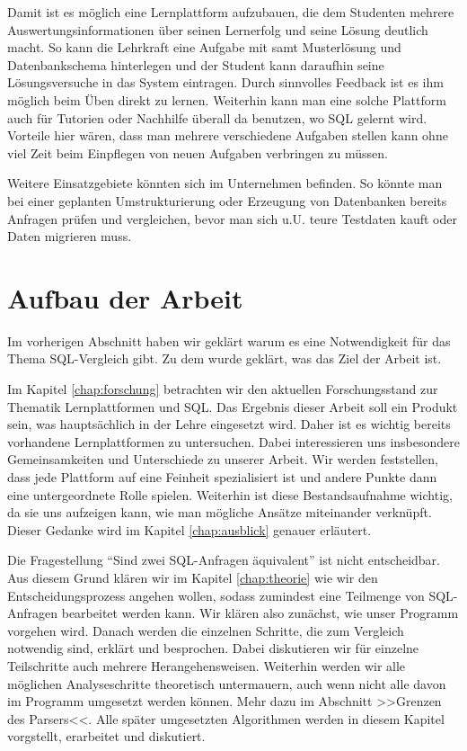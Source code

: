 Damit ist es möglich eine Lernplattform aufzubauen, die dem Studenten mehrere Auswertungsinformationen über seinen Lernerfolg und seine Lösung deutlich macht. So kann die Lehrkraft eine Aufgabe mit samt Musterlösung und Datenbankschema hinterlegen und der Student kann daraufhin seine Lösungsversuche in das System eintragen. Durch sinnvolles Feedback ist es ihm möglich beim Üben direkt zu lernen. Weiterhin kann man eine solche Plattform auch für Tutorien oder Nachhilfe überall da benutzen, wo SQL gelernt wird. Vorteile hier wären, dass man mehrere verschiedene Aufgaben stellen kann ohne viel Zeit beim Einpflegen von neuen Aufgaben verbringen zu müssen.

Weitere Einsatzgebiete könnten sich im Unternehmen befinden. So könnte man bei einer geplanten Umstrukturierung oder Erzeugung von Datenbanken bereits Anfragen prüfen und vergleichen, bevor man sich u.U. teure Testdaten kauft oder Daten migrieren muss.

\section{Aufbau der Arbeit}

Im vorherigen Abschnitt haben wir geklärt warum es eine Notwendigkeit für das Thema SQL-Vergleich gibt. Zu dem wurde geklärt, was das Ziel der Arbeit ist. 

Im Kapitel \ref{chap:forschung} betrachten wir den aktuellen Forschungsstand zur Thematik Lernplattformen und SQL. Das Ergebnis dieser Arbeit soll ein Produkt sein, was hauptsächlich in der Lehre eingesetzt wird. Daher ist es wichtig bereits vorhandene Lernplattformen zu untersuchen. Dabei interessieren uns insbesondere Gemeinsamkeiten und Unterschiede zu unserer Arbeit. Wir werden feststellen, dass jede Plattform auf eine Feinheit spezialisiert ist und andere Punkte dann eine untergeordnete Rolle spielen. Weiterhin ist diese Bestandsaufnahme wichtig, da sie uns aufzeigen kann, wie man mögliche Ansätze miteinander verknüpft. Dieser Gedanke wird im Kapitel \ref{chap:ausblick} genauer erläutert.

Die Fragestellung ``Sind zwei SQL-Anfragen äquivalent'' ist nicht entscheidbar. Aus diesem Grund klären wir im Kapitel \ref{chap:theorie} wie wir den Entscheidungsprozess angehen wollen, sodass zumindest eine Teilmenge von SQL-Anfragen bearbeitet werden kann. Wir klären also zunächst, wie unser Programm vorgehen wird. Danach werden die einzelnen Schritte, die zum Vergleich notwendig sind, erklärt und besprochen. Dabei diskutieren wir für einzelne Teilschritte auch mehrere Herangehensweisen. Weiterhin werden wir alle möglichen Analyseschritte theoretisch untermauern, auch wenn nicht alle davon im Programm umgesetzt werden können. Mehr dazu im Abschnitt >>Grenzen des Parsers<<. Alle später umgesetzten Algorithmen werden in diesem Kapitel vorgstellt, erarbeitet und diskutiert.


